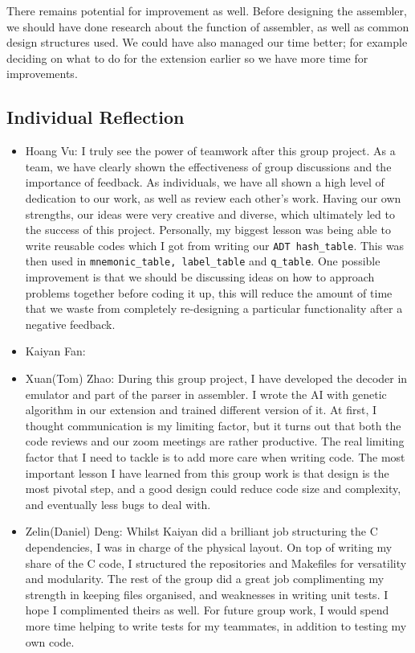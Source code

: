 \documentclass[11pt]{article}
\begin{document}
\begin{flushleft}
There remains potential for improvement as well. Before designing the assembler, we should have done research about the function of assembler, as well as common design structures used. We could have also managed our time better; for example deciding on what to do for the extension earlier so we have more time for improvements. 
\end{flushleft}


\subsection{Individual Reflection}
\begin{itemize}
    \item Hoang Vu: I truly see the power of teamwork after this group project. As a team, we have clearly shown the effectiveness of group discussions and the importance of feedback. As individuals, we have all shown a high level of dedication to our work, as well as review each other's work. Having our own strengths, our ideas were very creative and diverse, which ultimately led to the success of this project.  Personally, my biggest lesson was being able to write reusable codes which I got from writing our \texttt{ADT hash\_table}. This was then used in \texttt{mnemonic\_table, label\_table} and \texttt{q\_table}. One possible improvement is that we should be discussing ideas on how to approach problems together before coding it up, this will reduce the amount of time that we waste from completely re-designing a particular functionality after a negative feedback.    
    \item Kaiyan Fan:
    \item Xuan(Tom) Zhao: During this group project, I have developed the decoder in emulator and part of the parser in assembler. I wrote the AI with genetic algorithm in our extension and trained different version of it. At first, I thought communication is my limiting factor, but it turns out that both the code reviews and our zoom meetings are rather productive. The real limiting factor that I need to tackle is to add more care when writing code. The most important lesson I have learned from this group work is that design is the most pivotal step, and a good design could reduce code size and complexity, and eventually less bugs to deal with.
    \item Zelin(Daniel) Deng: Whilst Kaiyan did a brilliant job structuring the C dependencies, I was in charge of the physical layout. On top of writing my share of the C code, I structured the repositories and Makefiles for versatility and modularity. The rest of the group did a great job complimenting my strength in keeping files organised, and weaknesses in writing unit tests. I hope I complimented theirs as well. For future group work, I would spend more time helping to write tests for my teammates, in addition to testing my own code.  
\end{itemize}


\printbibliography
\end{document}

